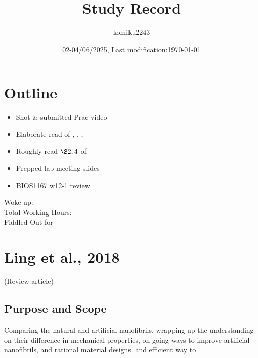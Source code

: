 \documentclass{ltjsarticle}
\title{Study Record}
\date{02-04/06/2025, Last modification:\today}
\author{komiku2243}
\numberwithin{equation}{subsection}
\begin{document}
\maketitle
\tableofcontents
\section{Outline}
\begin{itemize}
    \item Shot \& submitted Prac video
    \item Elaborate read of \cite{ling}, \cite{mohammadi}, \cite{shen}, \cite{tersteegen}
    \item Roughly read $\S 2, 4$ of \cite{guevorkian}
    \item Prepped lab meeting slides
    \item BIOS1167 w12-1 review
\end{itemize}
Woke up: \\
Total Working Hours:\\
Fiddled Out for 
\newpage
\section{Ling et al., 2018 \cite{ling}}
(Review article)
\subsection{Purpose and Scope}
Comparing the natural and artificial nanofibrils, wrapping up the understanding on their difference in mechanical properties,
 on-going ways to improve artificial nanofibrils, and rational material designs.
and efficient way to 
\end{document}
